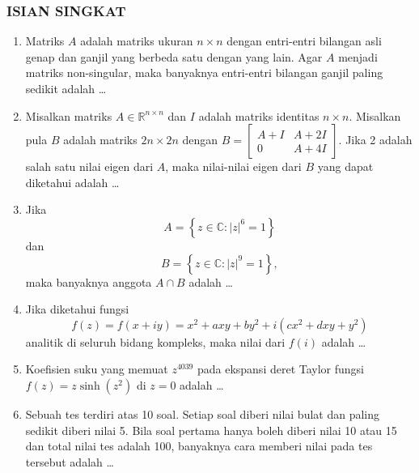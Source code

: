 \documentclass[12pt,twoside]{article}
\begin{document}
\subsubsection*{ISIAN SINGKAT}
\begin{enumerate}
	\item Matriks $A$ adalah matriks ukuran $n \times n$ dengan entri-entri bilangan asli genap dan ganjil yang berbeda satu dengan yang lain. Agar $A$ menjadi matriks non-singular, maka banyaknya entri-entri bilangan ganjil paling sedikit adalah \dots

	\item Misalkan matriks $A \in \mathbb{R}^{n \times n}$ dan $I$ adalah matriks identitas $n \times n$. Misalkan pula $B$ adalah matriks $2n \times 2n$ dengan $B= \begin{bmatrix} A+I & A+2I \\ 0 & A+4I \end{bmatrix}$. Jika 2 adalah salah satu nilai eigen dari $A$, maka nilai-nilai eigen dari $B$ yang dapat diketahui adalah \dots

	\item Jika $$A = \left\lbrace z \in \mathbb{C} : \left|z\right|^6 = 1\right\rbrace$$ dan $$B = \left\lbrace z \in \mathbb{C} : \left|z\right|^9 = 1\right\rbrace,$$ maka banyaknya anggota $A \cap B$ adalah \dots

	\item Jika diketahui fungsi $$f\left(z\right) = f\left(x+iy\right) = x^2+axy+by^2 + i\left(cx^2+dxy+y^2\right)$$ analitik di seluruh bidang kompleks, maka nilai dari $f\left(i\right)$ adalah \dots

	\item Koefisien suku yang memuat $z^{4039}$ pada ekspansi deret Taylor fungsi $f\left(z\right) = z \sinh \left(z^2\right)$ di $z = 0$ adalah \dots

	\item Sebuah tes terdiri atas 10 soal. Setiap soal diberi nilai bulat dan paling sedikit diberi nilai 5. Bila soal pertama hanya boleh diberi nilai 10 atau 15 dan total nilai tes adalah 100, banyaknya cara memberi nilai pada tes tersebut adalah \dots
\end{enumerate}
\end{document}
